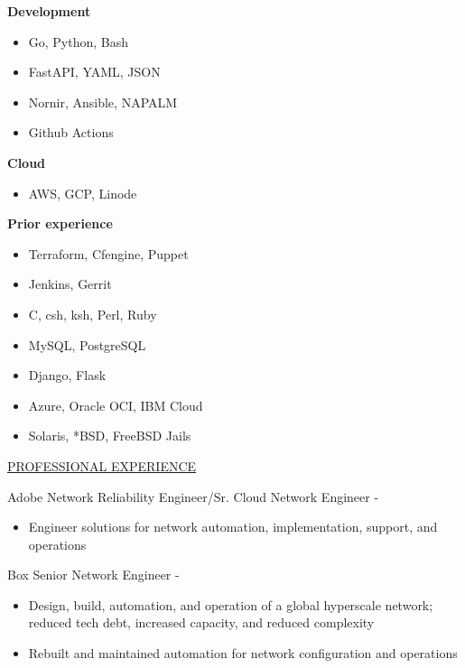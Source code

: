 \documentclass[11pt]{article}
\newcommand{\betteruline}[1]{
    \uline{#1}
}
\newcommand{\sectiontitle}[1]{
    \begingroup
        \titlebold{}
        \betteruline{\Large\uppercase{#1}  }
        \vspace{1.7mm}
    \endgroup
}
\newcommand{\sectioncontent}[1]{
    \begingroup
        \begin{FlushLeft}
        \vspace{-3mm}
        \sffamily\small#1
        \end{FlushLeft}
    \endgroup
    \vspace{2mm}
}
\newcommand{\job}[3]{
    \begingroup
        \titlethick{}\small#1 \hfill \small#2 \-- \color{black!70}\titlethin{\small{#3}}
    \endgroup
}
\newcommand{\spacevv}{
    \vspace{2mm}
}
\begin{document}
\begin{paracol}{2}
{        \textbf{Development} \\
        \begin{itemize}
          \item Go, Python, Bash
          \item FastAPI, YAML, JSON
          \item Nornir, Ansible, NAPALM
          \item Github Actions
        \end{itemize}
        \spacevv{}

        \textbf{Cloud} \\
        \begin{itemize}
            \item AWS, GCP, Linode
        \end{itemize}
        \spacevv{}

        \textbf{Prior experience} \\
        \begin{itemize}
            \item Terraform, Cfengine, Puppet
            \item Jenkins, Gerrit
            \item C, csh, ksh, Perl, Ruby
            \item MySQL, PostgreSQL
            \item Django, Flask
            \item Azure, Oracle OCI, IBM Cloud
            \item Solaris, *BSD, FreeBSD Jails
        \end{itemize}
    }



    \switchcolumn{}

    \sectiontitle{professional experience}
    \sectioncontent{

      \job{Adobe}{Network Reliability Engineer/Sr. Cloud Network Engineer}{2021\--2022}
      \begin{itemize}
        \item Engineer solutions for network automation, implementation, support, and operations
      \end{itemize}
      \spacevv{}

      \job{Box}{Senior Network Engineer}{2019\--2021}
      \begin{itemize}
        \item Design, build, automation, and operation of a global hyperscale network; reduced tech debt, increased
            capacity, and reduced complexity
        \item Rebuilt and maintained automation for network configuration and operations
      \end{itemize}

}
\end{paracol}
\end{document}
